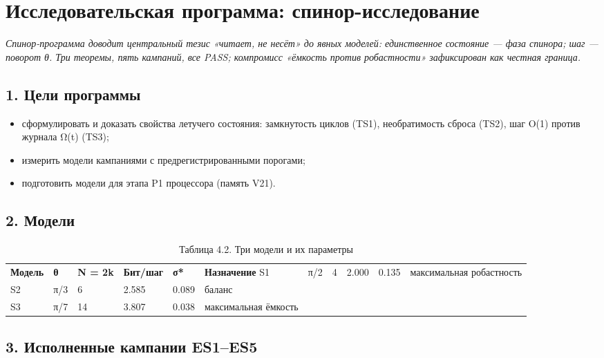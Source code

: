 \documentclass[11pt,a4paper]{article}
\begin{document}
\section{Исследовательская программа: спинор-исследование}

\noindent\textit{\color{copper}Спинор-программа доводит центральный тезис «читает, не несёт» до явных моделей: единственное состояние — фаза спинора; шаг — поворот θ. Три теоремы, пять кампаний, все PASS; компромисс «ёмкость против робастности» зафиксирован как честная граница.}

\subsection{1. Цели программы}

\begin{itemize}
  \item сформулировать и доказать свойства летучего состояния: замкнутость циклов (TS1), необратимость сброса (TS2), шаг O(1) против журнала Ω(t) (TS3);
  \item измерить модели кампаниями с предрегистрированными порогами;
  \item подготовить модели для этапа P1 процессора (память V21).
\end{itemize}

\subsection{2. Модели}

\begin{table}[htbp]\centering\small
\caption{Таблица 4.2. Три модели и их параметры}
\begin{tabular}{p{} p{} p{} p{} p{} p{}}
\toprule
\textbf{Модель} & \textbf{θ} & \textbf{N = 2k} & \textbf{Бит/шаг} & \textbf{σ*} & \textbf{Назначение}
\midrule
S1 & π/2 & 4 & 2.000 & 0.135 & максимальная робастность \\
S2 & π/3 & 6 & 2.585 & 0.089 & баланс \\
S3 & π/7 & 14 & 3.807 & 0.038 & максимальная ёмкость \\
\bottomrule
\end{tabular}
\end{table}

\subsection{3. Исполненные кампании ES1–ES5}
\end{document}
